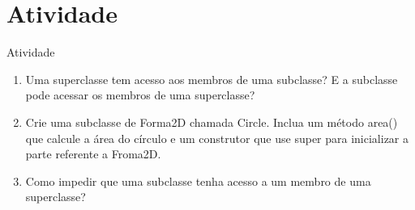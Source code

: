 \documentclass[11pt,aspectratio=43,ignorenonframetext,t]{beamer}
\begin{document}
\section{Atividade}
\begin{frame}{Atividade}
  \begin{enumerate}
   \item Uma superclasse tem acesso aos membros de uma subclasse? E a subclasse 
pode acessar os membros de uma superclasse? 
  \item Crie uma subclasse de Forma2D chamada Circle. Inclua um método area() 
que calcule a área do círculo e um construtor que use super para inicializar a 
parte referente a Froma2D. 
  \item Como impedir que uma subclasse tenha acesso a um membro de uma 
superclasse? 
  \end{enumerate}
\end{frame}
\end{document}
